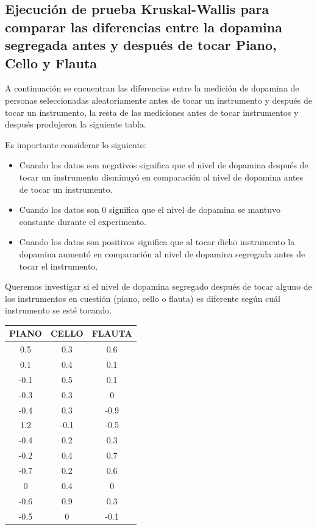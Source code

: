\subsection{Ejecución de prueba Kruskal-Wallis para comparar las diferencias entre la dopamina segregada antes y después de tocar Piano, Cello y Flauta}
A continuación se encuentran las diferencias entre la medición de dopamina de personas seleccionadas aleatoriamente antes de tocar un instrumento y después de tocar un instrumento, la resta de las mediciones antes de tocar instrumentos y después produjeron la siguiente tabla.

Es importante considerar lo siguiente: 
\begin{itemize}
    \item Cuando los datos son negativos significa que el nivel de dopamina después de tocar un instrumento disminuyó en comparación al nivel de dopamina antes de tocar un instrumento.
    \item Cuando los datos son 0 significa que el nivel de dopamina se mantuvo constante durante el experimento. 
    \item Cuando los datos son positivos significa que al tocar dicho instrumento la dopamina aumentó en comparación al nivel de dopamina segregada antes de tocar el instrumento.
\end{itemize}

Queremos investigar si el nivel de dopamina segregado después de tocar alguno de los instrumentos en cuestión (piano, cello o flauta) es diferente según cuál instrumento se esté tocando.

\begin{center}
    \begin{tabular}{ |ccc| }
        \hline  
            PIANO & CELLO & FLAUTA \\ 
        \hline
            0.5 & 0.3 & 0.6  \\
            0.1 & 0.4 & 0.1   \\
            -0.1 & 0.5 & 0.1   \\
            -0.3 & 0.3 & 0   \\
            -0.4 & 0.3 & -0.9   \\
            1.2 & -0.1 & -0.5   \\
            -0.4 & 0.2 & 0.3   \\
            -0.2 & 0.4 & 0.7   \\
            -0.7 & 0.2 & 0.6   \\
            0 & 0.4 & 0  \\
            -0.6 & 0.9 & 0.3   \\
            -0.5 & 0 & -0.1  \\ 
        \hline
    \end{tabular}
\end{center}

